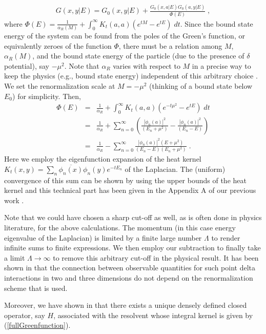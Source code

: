 \documentclass[amsmath,amssymb,14pt]{article}
\numberwithin{equation}{section}
\begin{document}
%
\begin{eqnarray}
G(x,y|E)= G_0(x,y|E) + \frac{G_0(x,a|E) G_0(a,y|E)}{\Phi(E)} \;, \label{fullGreenfunction}
\end{eqnarray}
%
where $ \Phi(E) = \frac{1}{\alpha_R(M)} + \int_{0}^{\infty} K_t(a,a) \left( e^{t M}- e^{t E} \right) \; d t$. Since the bound state energy of the system can be found from the poles of the Green's function, or equivalently zeroes of the function $\Phi$, there must be a relation among $M$, $\alpha_R(M)$, and the bound state
energy of the particle  (due to the presence of $\delta$ potential), say $-\mu^2$. Note that $\alpha_R$ varies with respect to $M$ in a precise way to keep the physics (e.g., bound state energy) independent of this arbitrary choice \cite{AltunkaynakErmanTurgut, ErmanTurgut}. We set the renormalization scale at $M=-\mu^2$ (thinking of a bound state below $E_0$) for simplicity. Then, 
%
\begin{eqnarray}
   \Phi(E) & = & \frac{1}{\alpha_R} + \int_{0}^{\infty} K_t(a,a) \left( e^{-t\mu^2}- e^{t E} \right) \; d t \nonumber \\ & = & 
   \frac{1}{\alpha_R} + \sum_{n=0}^{\infty} \left( \frac{|\phi_n(a)|^2}{(E_n+\mu^2)}-\frac{|\phi_n(a)|^2}{(E_n-E)}  \right) \nonumber 
   \\ & = &  \frac{1}{\alpha_R}- \sum_{n=0}^{\infty} \frac{|\phi_n(a)|^2(E+\mu^2)}{(E_n-E)(E_n+\mu^2)}\;. \label{Phisum}
\end{eqnarray}
%
Here we employ the eigenfunction expansion of the heat kernel $K_t(x,y)=\sum_n \overline{\phi_n(x)} \phi_n(y) e^{-t E_n}$ of the Laplacian. The (uniform) convergence of this sum can be shown by using the upper bounds of the heat kernel and this technical part has been given in the Appendix A of our previous work \cite{Annals23}.

Note that we could have chosen a sharp cut-off as well, as is often done in physics literature, for the above calculations. The momentum (in this case energy eigenvalue of the Laplacian) is limited by a finite large number $\Lambda$ to render infinite sums to finite expressions. We then  employ our subtraction to finally take a limit $\Lambda\to \infty$ to remove this arbitrary cut-off in the physical result. It has been shown in \cite{DuttaRoy} that the connection between observable quantities for such point delta interactions in two and three dimensions do not depend on the renormalization scheme that is used.

Moreover, we have shown in \cite{existence} that there exists a unique densely defined closed operator, say $H$, associated with the resolvent whose integral kernel is given by (\ref{fullGreenfunction}).
\end{document}
